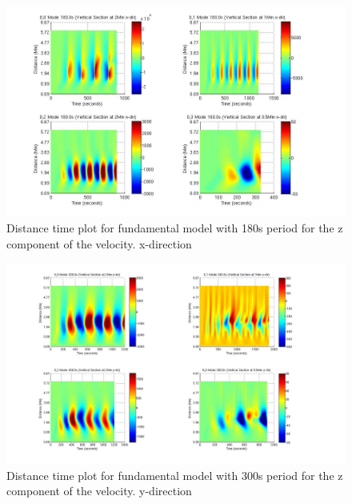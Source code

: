 \documentclass[final,1p]{elsarticle}
\begin{document}
\begin{figure}[h]
\includegraphics[scale=0.45]{imagesn/dt_180_vert_x.jpg}
\caption{Distance time plot for fundamental model with 180s period for the z component of the velocity.  x-direction}
\end{figure}



\begin{figure}[h]
\includegraphics[scale=0.3]{imagesn/dt_300_vert_y.jpg}
\caption{Distance time plot for fundamental model with 300s period for the z component of the velocity. y-direction }
\end{figure}

\end{document}
